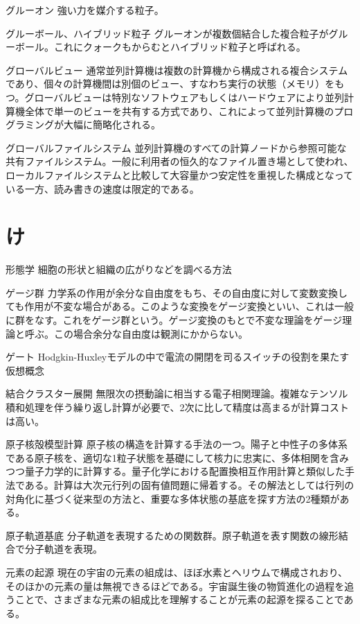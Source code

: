 \begin{用語集}
\item{グルーオン}{}
{強い力を媒介する粒子。}
\item{グルーボール、ハイブリッド粒子}{}
{グルーオンが複数個結合した複合粒子がグルーボール。これにクォークもからむとハイブリッド粒子と呼ばれる。}
\item{グローバルビュー}{}
{通常並列計算機は複数の計算機から構成される複合システムであり、個々の計算機間は別個のビュー、すなわち実行の状態（メモリ）をもつ。グローバルビューは特別なソフトウェアもしくはハードウェアにより並列計算機全体で単一のビューを共有する方式であり、これによって並列計算機のプログラミングが大幅に簡略化される。}
\item{グローバルファイルシステム}{}
{並列計算機のすべての計算ノードから参照可能な共有ファイルシステム。一般に利用者の恒久的なファイル置き場として使われ、ローカルファイルシステムと比較して大容量かつ安定性を重視した構成となっている一方、読み書きの速度は限定的である。}
\section{け}
\item{形態学}{}
{細胞の形状と組織の広がりなどを調べる方法}
\item{ゲージ群}{}
{力学系の作用が余分な自由度をもち、その自由度に対して変数変換しても作用が不変な場合がある。このような変換をゲージ変換といい、これは一般に群をなす。これをゲージ群という。ゲージ変換のもとで不変な理論をゲージ理論と呼ぶ。この場合余分な自由度は観測にかからない。}
\item{ゲート}{}
{Hodgkin-Huxleyモデルの中で電流の開閉を司るスイッチの役割を果たす仮想概念}
\item{結合クラスター展開}{}
{無限次の摂動論に相当する電子相関理論。複雑なテンソル積和処理を伴う繰り返し計算が必要で、2次に比して精度は高まるが計算コストは高い。}
\item{原子核殻模型計算}{}
{原子核の構造を計算する手法の一つ。陽子と中性子の多体系である原子核を、適切な1粒子状態を基礎にして核力に忠実に、多体相関を含みつつ量子力学的に計算する。量子化学における配置換相互作用計算と類似した手法である。計算は大次元行列の固有値問題に帰着する。その解法としては行列の対角化に基づく従来型の方法と、重要な多体状態の基底を探す方法の2種類がある。}
\item{原子軌道基底}{}
{分子軌道を表現するための関数群。原子軌道を表す関数の線形結合で分子軌道を表現。}
\item{元素の起源}{}
{現在の宇宙の元素の組成は、ほぼ水素とヘリウムで構成されおり、そのほかの元素の量は無視できるほどである。宇宙誕生後の物質進化の過程を追うことで、さまざまな元素の組成比を理解することが元素の起源を探ることである。}

\end{用語集}
